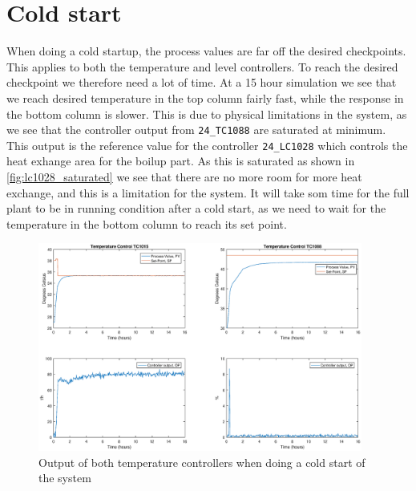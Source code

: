 \section{Cold start}
When doing a cold startup, the process values are far off the desired checkpoints. This applies to both the temperature and level controllers. To reach the desired checkpoint we therefore need a lot of time. At a 15 hour simulation we see that we reach desired temperature in the top column fairly fast, while the response in the bottom column is slower. This is due to physical limitations in the system, as we see that the controller output from \texttt{24\_TC1088} are saturated at minimum. This output is the reference value for the controller \texttt{24\_LC1028} which controls the heat exhange area for the boilup part. As this is saturated as shown in \autoref{fig:lc1028_saturated} we see that there are no more room for more heat exchange, and this is a limitation for the system. It will take som time for the full plant to be in running condition after a cold start, as we need to wait for the temperature in the bottom column to reach its set point.

\begin{figure}[ht!]
	\centering
	\includegraphics[width=0.95\textwidth]{fig/results/coldstart_both.eps}
	\caption{Output of both temperature controllers when doing a cold start of the system}
	\label{fig:coldstart_both}
\end{figure}

